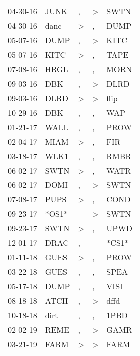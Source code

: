 \begin{supertabular}{lllll}
 04-30-16 &   JUNK &                , &     \textgreater &   SWTN \\
 04-30-16 &   danc &     \textgreater &                , &   DUMP \\
 05-07-16 &   DUMP &                , &     \textgreater &   KITC \\
 05-07-16 &   KITC &     \textgreater &                , &   TAPE \\
 07-08-16 &   HRGL &                , &                , &   MORN \\
 09-03-16 &    DBK &                , &     \textgreater &   DLRD \\
 09-03-16 &   DLRD &     \textgreater &     \textgreater &   flip \\
 10-29-16 &    DBK &                , &                , &    WAP \\
 01-21-17 &   WALL &                , &                , &   PROW \\
 02-04-17 &   MIAM &     \textgreater &                , &    FIR \\
 03-18-17 &   WLK1 &                , &                , &   RMBR \\
 06-02-17 &   SWTN &     \textgreater &                , &   WATR \\
 06-02-17 &   DOMI &                , &     \textgreater &   SWTN \\
 07-08-17 &   PUPS &     \textgreater &                , &   COND \\
 09-23-17 &  *OS1* &                  &     \textgreater &   SWTN \\
 09-23-17 &   SWTN &     \textgreater &                , &   UPWD \\
 12-01-17 &   DRAC &                , &                  &  *CS1* \\
 01-11-18 &   GUES &     \textgreater &                , &   PROW \\
 03-22-18 &   GUES &                , &                , &   SPEA \\
 05-17-18 &   DUMP &                , &                , &   VISI \\
 08-18-18 &   ATCH &                , &     \textgreater &   dffd \\
 10-18-18 &   dirt &                , &                , &   1PBD \\
 02-02-19 &   REME &                , &     \textgreater &   GAMR \\
 03-21-19 &   FARM &     \textgreater &     \textgreater &   FARM \\

\end{supertabular}
